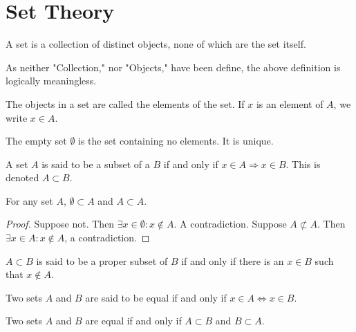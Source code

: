 \documentclass[crop=false,class=book,oneside]{standalone}
\begin{document}
        \section{Set Theory}
            \begin{definition}
                A set is a collection of distinct objects,
                none of which are the set itself.
            \end{definition}
            As neither "Collection," nor "Objects," have been
            define, the above definition is logically meaningless.
            \begin{definition}
                The objects in a set are called the elements of
                the set. If $x$ is an element of $A$,
                we write $x\in A$.
            \end{definition}
            \begin{definition}
                The empty set $\emptyset$ is the set containing
                no elements. It is unique.
            \end{definition}
            \begin{definition}
                A set $A$ is said to be a subset of a $B$ if
                and only if $x\in{A}\Rightarrow{x}\in{B}$.
                This is denoted $A\subset B$.
            \end{definition}
            \begin{corollary}
                For any set $A$, $\emptyset\subset{A}$
                and $A\subset{A}$.
            \end{corollary}
            \begin{proof}
                Suppose not. Then
                $\exists{x}\in\emptyset:x\notin A$.
                A contradiction. Suppose $A\not\subset A$.
                Then $\exists{x}\in{A}:x\notin{A}$,
                a contradiction.
            \end{proof}
            \begin{definition}
                $A\subset B$ is said to be a proper subset
                of $B$ if and only if there is an $x\in B$
                such that $x\notin A$.
            \end{definition}
            \begin{definition}
                Two sets $A$ and $B$ are said to be equal
                if and only if $x\in{A}\Leftrightarrow{x}\in B$.
            \end{definition}
            \begin{theorem}
                Two sets $A$ and $B$ are equal if and only
                if $A\subset{B}$ and $B\subset{A}$.
            \end{theorem}
\end{document}
